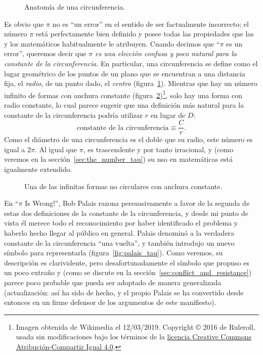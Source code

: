\begin{figure}
\caption{Anatomía de una circunferencia.\label{fig:circle}}
\end{figure}

Es obvio que $\pi$ no es ``un error'' en el sentido de ser factualmente incorrecto; el número $\pi$ está perfectamente bien definido y posee todas las propiedades que las y los matemáticos habitualmente le atribuyen. Cuando decimos que ``$\pi$ es un error'', queremos decir que \emph{$\pi$ es una elección confusa y poco natural para la constante de la circunferencia}. En particular, una circunferencia se define como el lugar geométrico de los puntos de un plano que se encuentran a una distancia fija, el \emph{radio}, de un punto dado, el \emph{centro} (figura~\ref{fig:circle}). Mientras que hay un número infinito de formas con anchura constante (figura~\ref{fig:constant_width})\footnote{Imagen obtenida de Wikimedia el 12/03/2019. Copyright © 2016 de Ruleroll, usada sin modificaciones bajo los términos de la \href{https://creativecommons.org/licenses/by-sa/4.0/deed.es}{licencia Creative Commons Atribución-Compartir Igual 4.0}.}, solo hay una forma con radio constante, lo cual parece sugerir que una definición más natural para la constante de la circunferencia podría utilizar $r$ en lugar de $D$:
\begin{equation}
\label{eq:circle_constant}
\mbox{constante de la circunferencia} \equiv \frac{C}{r}.
\end{equation}
Como el diámetro de una circunferencia es el doble que su radio, este número es igual a $2\pi$. Al igual que $\pi$, es trascendente y por tanto irracional, y (como veremos en la sección~\ref{sec:the_number_tau}) su uso en matemáticas está igualmente extendido.

\begin{figure}
\caption{Una de las infinitas formas no circulares con anchura constante.\label{fig:constant_width}}
\end{figure}

En ``$\pi$ Is Wrong!'', Bob Palais razona persuasivamente a favor de la segunda de estas dos definiciones de la constante de la circunferencia, y desde mi punto de vista él merece todo el reconocimiento por haber identificado el problema y haberlo hecho llegar al público en general. Palais denominó a la verdadera constante de la circunferencia ``una vuelta'', y también introdujo un nuevo símbolo para representarla (figura~\ref{fig:palais_tau}). Como veremos, su descripción es clarividente, pero desafortunadamente el símbolo que propuso es un poco extraño y (como se discute en la sección~\ref{sec:conflict_and_resistance}) parece poco probable que pueda ser adoptado de manera generalizada (actualización: así ha sido de hecho, y el propio Palais se ha convertido desde entonces en un firme defensor de los argumentos de este manifiesto).

